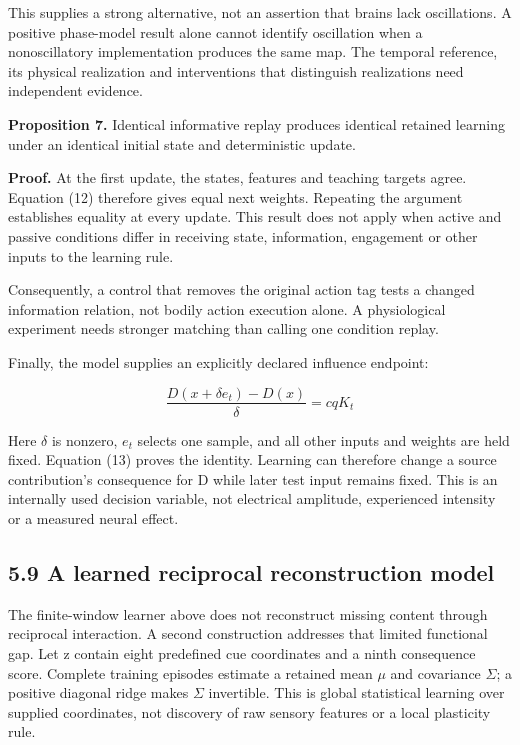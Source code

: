 \documentclass[
  american,
  11pt,
  letterpaper,
]{article}
\begin{document}
This supplies a strong alternative, not an assertion that brains lack oscillations. A positive phase-model result alone cannot identify oscillation when a nonoscillatory implementation produces the same map. The temporal reference, its physical realization and interventions that distinguish realizations need independent evidence.

\textbf{Proposition 7.} Identical informative replay produces identical retained learning under an identical initial state and deterministic update.

\textbf{Proof.} At the first update, the states, features and teaching targets agree. Equation (12) therefore gives equal next weights. Repeating the argument establishes equality at every update. This result does not apply when active and passive conditions differ in receiving state, information, engagement or other inputs to the learning rule.

Consequently, a control that removes the original action tag tests a changed information relation, not bodily action execution alone. A physiological experiment needs stronger matching than calling one condition replay.

Finally, the model supplies an explicitly declared influence endpoint:

\begin{equation}
\frac{D(x+\delta e_t)-D(x)}{\delta}=cqK_t\tag{14}
\end{equation}

Here \(\delta\) is nonzero, \(e_t\) selects one sample, and all other inputs and weights are held fixed. Equation (13) proves the identity. Learning can therefore change a source contribution's consequence for D while later test input remains fixed. This is an internally used decision variable, not electrical amplitude, experienced intensity or a measured neural effect.

\subsection{5.9 A learned reciprocal reconstruction model}\label{a-learned-reciprocal-reconstruction-model}

The finite-window learner above does not reconstruct missing content through reciprocal interaction. A second construction addresses that limited functional gap. Let z contain eight predefined cue coordinates and a ninth consequence score. Complete training episodes estimate a retained mean \(\mu\) and covariance \(\Sigma\); a positive diagonal ridge makes \(\Sigma\) invertible. This is global statistical learning over supplied coordinates, not discovery of raw sensory features or a local plasticity rule.
\end{document}
